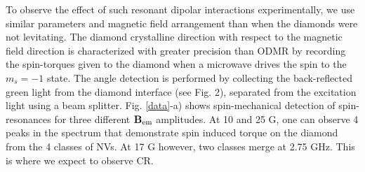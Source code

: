 \documentclass[preprintnumbers,amsmath,amssymb,superscriptaddress,twocolumn,showpacs]{revtex4-1}
\begin{document}

To observe the effect of such resonant dipolar interactions experimentally, we use similar parameters and magnetic field arrangement than when the diamonds were not levitating. The diamond crystalline direction with respect to the magnetic field direction is characterized with greater precision than ODMR by recording the spin-torques given to the diamond when a microwave drives the spin to the $m_s=-1$ state. 
The angle detection is performed by collecting the back-reflected green light from the diamond interface (see Fig. 2), separated from the excitation light using a beam splitter. 
Fig. \ref{data}-a) shows spin-mechanical detection of spin-resonances for three different $\bf B_{\rm em}$ amplitudes. 
At 10 and 25 G, one can observe 4 peaks in the spectrum that demonstrate spin induced torque on the diamond from the 4 classes of NVs.
At 17 G however, two classes merge at 2.75 GHz. This is where we expect to observe CR. 
\end{document}
